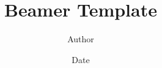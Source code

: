 \documentclass[dvipdfmx]{beamer}
\title[]{Beamer Template}
\subtitle{}
\author[]{Author}
\institute[]{Institute}
\date{Date}
\begin{document}
\begin{frame}
\titlepage
\end{frame}

\end{document}
